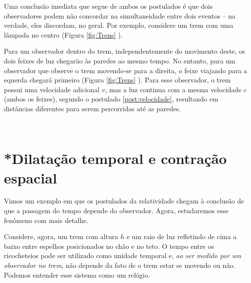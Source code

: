 Uma conclusão imediata que segue de ambos os postulados é que dois observadores podem não concordar na simultaneidade entre dois eventos -- na verdade, eles discordam, no geral. Por exemplo, considere um trem com uma lâmpada no centro (Figura \ref{fig:Trens} ).

Para um observador dentro do trem, independentemente do movimento deste, os dois feixes de luz chegarão às paredes ao mesmo tempo. No entanto, para um observador que observe o trem movendo-se para a direita, o feixe viajando para a equerda chegará primeiro (Figura \ref{fig:Trens} ). Para esse observador, o trem possui uma velocidade adicional $v$, mas a luz continua com a mesma velocidade $c$ (ambos os feixes), segundo o postulado \ref{post:velocidade}, resultando em distâncias diferentes para serem percorridas até as paredes.


\begin{figure*}[t]
    \centering
    \begin{subfigure}[t]{0.5\textwidth}
        \centering
        \caption{}
        \label{fig:trem}
    \end{subfigure}%
    ~ 
    \begin{subfigure}[t]{0.5\textwidth}
        \centering
        \caption{}
        \label{fig:TremMovimento}
    \end{subfigure}
    \caption{Feixes de luz partindo do centro de um trem ao mesmo tempo para (a) um observador que anda junto ao trem e (b) para um observador que vê o trem movendo-se com velocidade $v$ para a direita.}
\label{fig:Trens}
\end{figure*}

\section{*Dilatação temporal e contração espacial}
Vimos um exemplo em que os postulados da relatividade chegam à conclusão de que a passagem do tempo depende do observador. Agora, estudaremos esse fenômeno com mais detalhe.

Considere, agora, um trem com altura $h$ e um raio de luz refletindo de cima a baixo entre espelhos posicionados no chão e no teto. O tempo entre os ricocheteios pode ser utilizado como unidade temporal e, \textit{ao ser medido por um observador no trem}, não depende da fato de o trem estar se movendo ou não. Podemos entender esse sistema como um relógio. 

